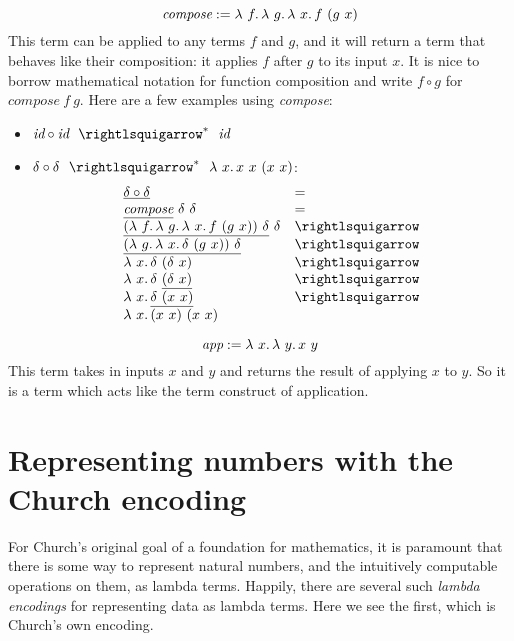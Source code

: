 \[
\textit{compose} := \lambda\ f.\, \lambda\ g.\, \lambda\ x.\, f\ (g\ x)
\]
\noindent This term can be applied to any terms $f$ and $g$, and it
will return a term that behaves like their composition: it applies $f$
after $g$ to its input $x$.  It is nice to borrow mathematical notation for
function composition and write $f \circ g$ for $\textit{compose}\ f\ g$.
Here are a few examples using \textit{compose}:
\begin{itemize}
\item $\textit{id} \circ \textit{id} \ \ \betaa^*\ \ \textit{id}$
\item $\delta\circ \delta \ \ \betaa^*\ \ \lam{x}{x\ x\ (x\ x)}$:
\[
\begin{array}{ll}
  \underline{\delta\circ \delta} & = \\
  \underline{\textit{compose}}\ \delta\ \delta & = \\
  \underline{(\lam{f}{\lam{g}{\lam{x}{f\ (g\ x)}}})\ \delta}\ \delta & \betaa \\
  \underline{(\lam{g}{\lam{x}{\delta\ (g\ x)}})\ \delta} & \betaa \\
  \lam{x}{\delta\ (\delta\ x)} & \betaa \\
  \lam{x}{\delta\ \underline{(\delta\ x)}} & \betaa \\
  \lam{x}{\underline{\delta\ (x\ x)}} & \betaa \\
  \lam{x}{(x\ x)\ (x\ x)} & \ 
\end{array}
\]
  
\end{itemize}

\[
\textit{app} := \lam{x}{\lam{y}{x\ y}}
\]
\noindent This term takes in inputs $x$ and $y$ and returns the result of applying $x$ to $y$.  So it is a term which acts like the term construct of application.

\section{Representing numbers with the Church encoding}
\label{sec:churchenc}

For Church's original goal of a foundation for mathematics, it is
paramount that there is some way to represent natural numbers, and the
intuitively computable operations on them, as lambda terms.  Happily,
there are several such \emph{lambda encodings} for representing data
as lambda terms.  Here we see the first, which is Church's own encoding.

